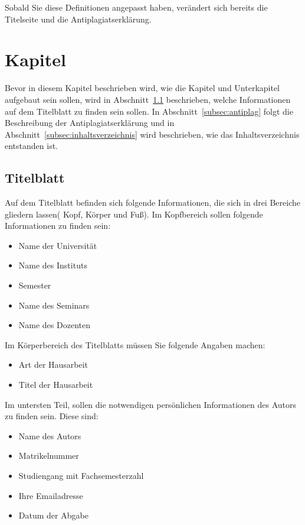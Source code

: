 \documentclass[
     11pt,         %
     a4paper,      %
     oneside,
     ]{article}
\begin{document}
Sobald Sie diese Definitionen angepasst haben, verändert sich bereits die Titelseite und die Antiplagiatserklärung.


\section{Kapitel}\label{sec:kapitel}
Bevor in diesem Kapitel beschrieben wird, wie die Kapitel und Unterkapitel aufgebaut sein sollen, wird in Abschnitt~\ref{subsec:titelblatt} beschrieben, welche Informationen auf dem Titelblatt zu finden sein sollen. In Abschnitt~\ref{subsec:antiplag} folgt die Beschreibung der Antiplagiatserklärung und in Abschnitt~\ref{subsec:inhaltsverzeichnis} wird beschrieben, wie das Inhaltsverzeichnis entstanden ist.

\subsection{Titelblatt}\label{subsec:titelblatt}
Auf dem Titelblatt befinden sich folgende Informationen, die sich in drei Bereiche gliedern lassen( Kopf, Körper und Fuß). Im Kopfbereich sollen folgende Informationen zu finden sein:

\begin{itemize}
\item Name der Universität
\item Name des Instituts
\item Semester
\item Name des Seminars
\item Name des Dozenten
\end{itemize}

Im Körperbereich des Titelblatts müssen Sie folgende Angaben machen:
\begin{itemize}
\item Art der Hausarbeit
\item Titel der Hausarbeit
\end{itemize}

Im untersten Teil, sollen die notwendigen persönlichen Informationen des Autors zu finden sein. Diese sind:
\begin{itemize}
\item Name des Autors
\item Matrikelnummer
\item Studiengang mit Fachsemesterzahl
\item Ihre Emailadresse
\item Datum der Abgabe
\end{itemize}
\end{document}
